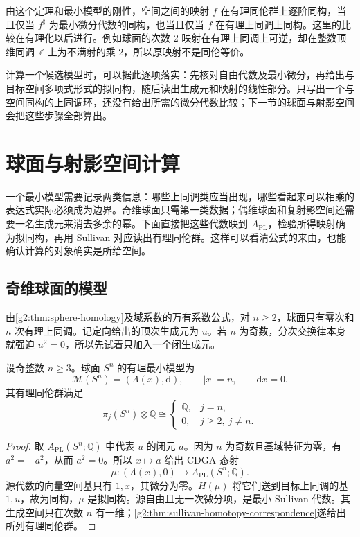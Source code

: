 \ProseParagraphBreak

由这个定理和最小模型的刚性，空间之间的映射 \(f\) 在有理同伦群上逐阶同构，当且仅当 \(f^\sharp\) 为最小微分代数的同构，也当且仅当 \(f\) 在有理上同调上同构。这里的比较在有理化以后进行。例如球面的次数 \(2\) 映射在有理上同调上可逆，却在整数顶维同调 \(\mathbb Z\) 上为不满射的乘 \(2\)，所以原映射不是同伦等价。

\ProseParagraphBreak

计算一个候选模型时，可以据此逐项落实：先核对自由代数及最小微分，再给出与目标空间多项式形式的拟同构，随后读出生成元和映射的线性部分。只写出一个与空间同构的上同调环，还没有给出所需的微分代数比较；下一节的球面与射影空间会把这些步骤全部算出。

\section{球面与射影空间计算}
\label{g2:sec:E03}

一个最小模型需要记录两类信息：哪些上同调类应当出现，哪些看起来可以相乘的表达式实际必须成为边界。奇维球面只需第一类数据；偶维球面和复射影空间还需要一名生成元来消去多余的幂。下面直接把这些代数映到 \(A_{\mathrm{PL}}\)，检验所得映射确为拟同构，再用 Sullivan 对应读出有理同伦群。这样可以看清公式的来由，也能确认计算的对象确实是所给空间。

\subsection{奇维球面的模型}
\label{g2:subsec:E03:01}

由\cref{g2:thm:sphere-homology}及域系数的万有系数公式，对 \(n\geq2\)，球面只有零次和 \(n\) 次有理上同调。记定向给出的顶次生成元为 \(u\)。若 \(n\) 为奇数，分次交换律本身就强迫 \(u^2=0\)，所以先试着只加入一个闭生成元。

\begin{proposition}\label{g2:prop:odd-sphere-minimal-model}
	设奇整数 \(n\geq3\)。球面 \(S^n\) 的有理最小模型为
	\[
		\mathcal M(S^n)=(\Lambda(x),\mathrm d),\qquad |x|=n,\qquad \mathrm dx=0.
	\]
	其有理同伦群满足
	\[
		\pi_j(S^n)\otimes\mathbb Q\cong
		\begin{cases}
			\mathbb Q,&j=n,\\
			0,&j\geq2,\ j\ne n.
		\end{cases}
	\]
\end{proposition}
\begin{proof}
	取 \(A_{\mathrm{PL}}(S^n;\mathbb Q)\) 中代表 \(u\) 的闭元 \(a\)。因为 \(n\) 为奇数且基域特征为零，有 \(a^2=-a^2\)，从而 \(a^2=0\)。所以 \(x\mapsto a\) 给出 CDGA 态射
	\[
		\mu:(\Lambda(x),0)\longrightarrow A_{\mathrm{PL}}(S^n;\mathbb Q).
	\]
	源代数的向量空间基只有 \(1,x\)，其微分为零。\(H(\mu)\) 将它们送到目标上同调的基 \(1,u\)，故为同构，\(\mu\) 是拟同构。源自由且无一次微分项，是最小 Sullivan 代数。其生成空间只在次数 \(n\) 有一维；\cref{g2:thm:sullivan-homotopy-correspondence}遂给出所列有理同伦群。
\end{proof}

